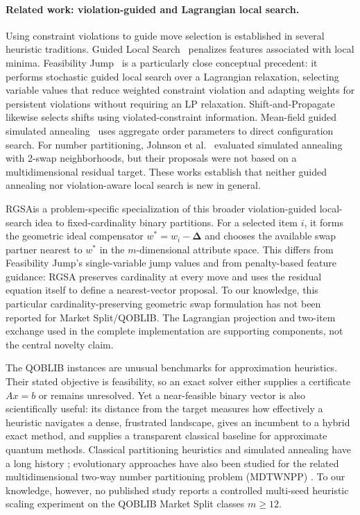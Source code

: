 \documentclass[11pt]{article}
\newcommand{\res}{\boldsymbol{\Delta}}
\newcommand{\RGSA}{\textsc{RGSA}}
\begin{document}
\paragraph{Related work: violation-guided and Lagrangian local search.}
Using constraint violations to guide move selection is established in several heuristic traditions. Guided Local Search~\cite{gls1999} penalizes features associated with local minima. Feasibility Jump~\cite{fj2023} is a particularly close conceptual precedent: it performs stochastic guided local search over a Lagrangian relaxation, selecting variable values that reduce weighted constraint violation and adapting weights for persistent violations without requiring an LP relaxation. Shift-and-Propagate~\cite{berthold2015} likewise selects shifts using violated-constraint information. Mean-field guided simulated annealing~\cite{isakov2003} uses aggregate order parameters to direct configuration search. For number partitioning, Johnson et al.~\cite{johnson1991} evaluated simulated annealing with 2-swap neighborhoods, but their proposals were not based on a multidimensional residual target. These works establish that neither guided annealing nor violation-aware local search is new in general.

\RGSA is a problem-specific specialization of this broader violation-guided local-search idea to fixed-cardinality binary partitions. For a selected item $i$, it forms the geometric ideal compensator $w^*=w_i-\res$ and chooses the available swap partner nearest to $w^*$ in the $m$-dimensional attribute space. This differs from Feasibility Jump's single-variable jump values and from penalty-based feature guidance: RGSA preserves cardinality at every move and uses the residual equation itself to define a nearest-vector proposal. To our knowledge, this particular cardinality-preserving geometric swap formulation has not been reported for Market Split/QOBLIB. The Lagrangian projection and two-item exchange used in the complete implementation are supporting components, not the central novelty claim.

The QOBLIB instances are unusual benchmarks for approximation heuristics. Their stated objective is feasibility, so an exact solver either supplies a certificate $Ax=b$ or remains unresolved. Yet a near-feasible binary vector is also scientifically useful: its distance from the target measures how effectively a heuristic navigates a dense, frustrated landscape, gives an incumbent to a hybrid exact method, and supplies a transparent classical baseline for approximate quantum methods. Classical partitioning heuristics and simulated annealing have a long history \cite{kirkpatrick1983,johnson1991,mertens1999}; evolutionary approaches have also been studied for the related multidimensional two-way number partitioning problem (MDTWNPP) \cite{kojic2010,santucci2021}. To our knowledge, however, no published study reports a controlled multi-seed heuristic scaling experiment on the QOBLIB Market Split classes $m\geq12$.
\end{document}
